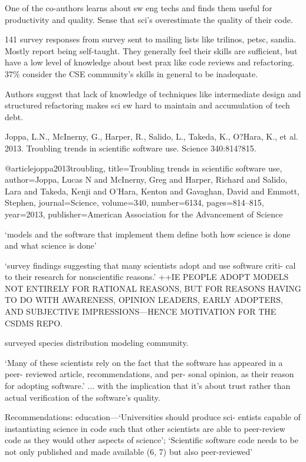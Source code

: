\documentclass[12pt]{amsart}
\begin{document}
One of the co-authors learns about sw eng techs and finds them useful for productivity and quality. Sense that sci's overestimate the quality of their code.

141 survey responses from survey sent to mailing lists like trilinos, petsc, sandia. Mostly report being self-taught. They generally feel their skills are sufficient, but have a low level of knowledge about best prax like code reviews and refactoring. 37\% consider the CSE community's skills in general to be inadequate. 

Authors suggest that lack of knowledge of techniques like intermediate design and structured refactoring makes sci sw hard to maintain and accumulation of tech debt. 



Joppa, L.N., McInerny, G., Harper, R., Salido, L., Takeda, K., O?Hara, K., et al. 2013. Troubling trends in scientific software use. Science 340:814?815.

@article{joppa2013troubling,
  title={Troubling trends in scientific software use},
  author={Joppa, Lucas N and McInerny, Greg and Harper, Richard and Salido, Lara and Takeda, Kenji and O'Hara, Kenton and Gavaghan, David and Emmott, Stephen},
  journal={Science},
  volume={340},
  number={6134},
  pages={814--815},
  year={2013},
  publisher={American Association for the Advancement of Science}
}

`models and the software that implement them define both how science is done and what science is done'

`survey findings suggesting that many scientists adopt and use software criti- cal to their research for nonscientific reasons.' ++IE PEOPLE ADOPT MODELS NOT ENTIRELY FOR RATIONAL REASONS, BUT FOR REASONS HAVING TO DO WITH AWARENESS, OPINION LEADERS, EARLY ADOPTERS, AND SUBJECTIVE IMPRESSIONS---HENCE MOTIVATION FOR THE CSDMS REPO.

surveyed species distribution modeling community. 

`Many of these scientists rely on the fact that the software has appeared in a peer- reviewed article, recommendations, and per- sonal opinion, as their reason for adopting software.' ... with the implication that it's about trust rather than actual verification of the software's quality. 

Recommendations: education---`Universities should produce sci- entists capable of instantiating science in code such that other scientists are able to peer-review code as they would other aspects of science'; `Scientific software code needs to be not only published and made available (6, 7) but also peer-reviewed'
\end{document}
